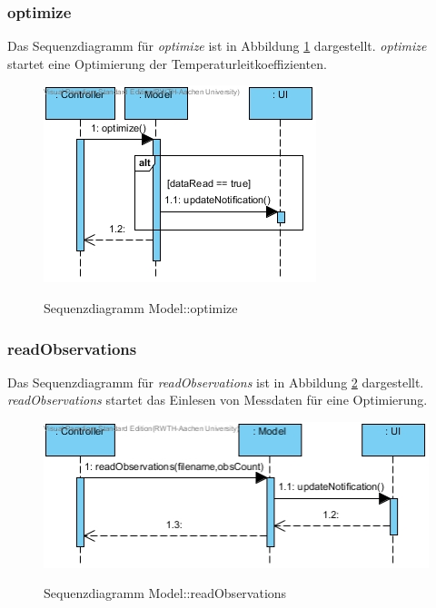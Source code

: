 \subsubsection*{optimize}

Das Sequenzdiagramm für \emph{optimize} ist in Abbildung \ref{Sequenzdiagramm Model::optimize} dargestellt. \emph{optimize} startet eine Optimierung der Temperaturleitkoeffizienten.

\begin{figure}[H]
	\centering
	\includegraphics[scale=.85]{Bilder/Model__optimize().jpg}\\
	\caption{Sequenzdiagramm Model::optimize}
	\label{Sequenzdiagramm Model::optimize}
\end{figure}

\subsubsection*{readObservations}

Das Sequenzdiagramm für \emph{readObservations} ist in Abbildung \ref{Sequenzdiagramm Model::readObservations} dargestellt. \emph{readObservations} startet das Einlesen von Messdaten für eine Optimierung.

\begin{figure}[H]
	\centering
	\includegraphics[scale=.85]{Bilder/Model__readObservations().jpg}\\
	\caption{Sequenzdiagramm Model::readObservations}
	\label{Sequenzdiagramm Model::readObservations}
\end{figure}

